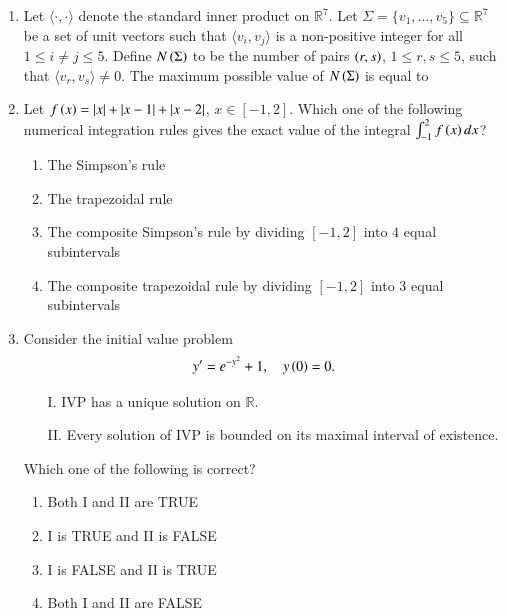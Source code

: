 \documentclass[journal,12pt,onecolumn]{IEEEtran}
\theoremstyle{remark}
\begin{document}
\begin{enumerate}
\item Let $\langle \cdot, \cdot \rangle$ denote the standard inner product on $\mathbb{R}^7$. Let $\Sigma = \{v_1, \dots, v_5\} \subseteq \mathbb{R}^7$ be a set of unit vectors such that $\langle v_i, v_j \rangle$ is a non-positive integer for all $1 \le i \neq j \le 5$. Define $N\left(\Sigma\right)$ to be the number of pairs $\left(r, s\right)$, $1 \le r, s \le 5$, such that $\langle v_r, v_s \rangle \neq 0$. The maximum possible value of $N\left(\Sigma\right)$ is equal to \hfill{}
\begin{enumerate}
\end{enumerate}

\item Let $f\left(x\right) = \left\vert x\right\vert + \left\vert x-1\right\vert + \left\vert x-2\right\vert$, $x \in [-1, 2]$. Which one of the following numerical integration rules gives the exact value of the integral $\int_{-1}^2 f\left(x\right) dx$? \hfill{}
\begin{enumerate}
    \item The Simpson's rule
    \item The trapezoidal rule
    \item The composite Simpson's rule by dividing $[-1, 2]$ into $4$ equal subintervals
    \item The composite trapezoidal rule by dividing $[-1, 2]$ into $3$ equal subintervals
\end{enumerate}

\item Consider the initial value problem 
\[ y' = e^{-y^2} + 1, \quad y\left(0\right) = 0. \]
\begin{enumerate}
    \item[I.] IVP has a unique solution on $\mathbb{R}$.
    \item[II.] Every solution of IVP is bounded on its maximal interval of existence.
\end{enumerate}
Which one of the following is correct? \hfill{}
\begin{enumerate}
    \item Both I and II are TRUE
    \item I is TRUE and II is FALSE
    \item I is FALSE and II is TRUE
    \item Both I and II are FALSE
\end{enumerate}


\end{enumerate}
\end{document}
